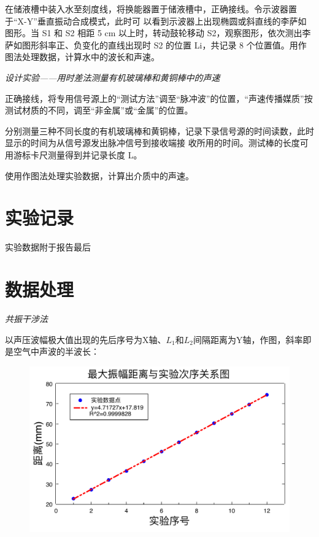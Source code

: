 \documentclass[UTF8]{ctexart}
\begin{document}
    在储液槽中装入水至刻度线，将换能器置于储液槽中，正确接线。令示波器置于“X-Y”垂直振动合成模式，此时可
    以看到示波器上出现椭圆或斜直线的李萨如图形。当 S1 和 S2 相距 5 cm 以上时，转动鼓轮移动
    S2，观察图形，依次测出李萨如图形斜率正、负变化的直线出现时 S2 的位置 Li，共记录 8 个位置值。用作图法处理数据，计算水中的波长和声速。

    \begin{center}
        \emph{设计实验——用时差法测量有机玻璃棒和黄铜棒中的声速}\\[0.4cm]
    \end{center}

    正确接线，将专用信号源上的“测试方法”调至“脉冲波”的位置，“声速传播媒质”按测试材质的不同，调至“非金属”或“金属”的位置。

    分别测量三种不同长度的有机玻璃棒和黄铜棒，记录下录信号源的时间读数，此时显示的时间为从信号源发出脉冲信号到接收端接
    收所用的时间。测试棒的长度可用游标卡尺测量得到并记录长度 L。

    使用作图法处理实验数据，计算出介质中的声速。

    \section{实验记录}
    实验数据附于报告最后

    \section{数据处理}

    \begin{center}
        \emph{共振干涉法}\\[0.4cm]
    \end{center}
    
    以声压波幅极大值出现的先后序号为X轴、$L_1$和$L_2$间隔距离为Y轴，作图，斜率即是空气中声波的半波长：

    \begin{figure}[ht]
        \centering 
        \includegraphics[width=15cm]{共振干涉.pdf}
    \end{figure}
\end{document}
